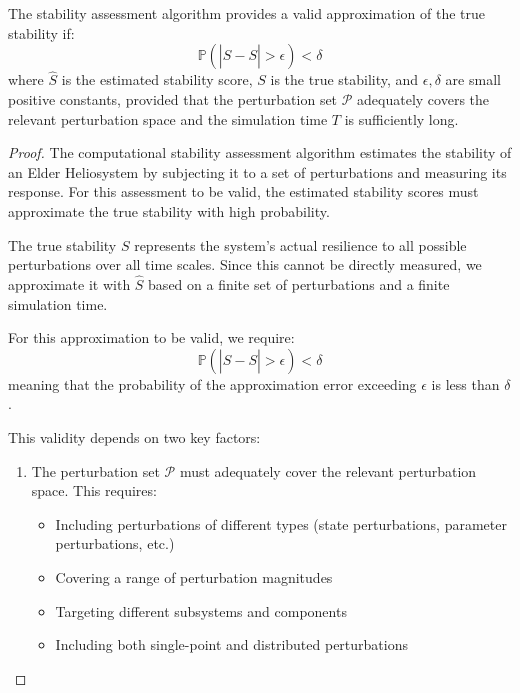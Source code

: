 \begin{theorem}
The stability assessment algorithm provides a valid approximation of the true stability if:
\begin{equation}
\mathbb{P}(|\hat{S} - S| > \epsilon) < \delta
\end{equation}
where $\hat{S}$ is the estimated stability score, $S$ is the true stability, and $\epsilon, \delta$ are small positive constants, provided that the perturbation set $\mathcal{P}$ adequately covers the relevant perturbation space and the simulation time $T$ is sufficiently long.
\end{theorem}

\begin{proof}
The computational stability assessment algorithm estimates the stability of an Elder Heliosystem by subjecting it to a set of perturbations and measuring its response. For this assessment to be valid, the estimated stability scores must approximate the true stability with high probability.

The true stability $S$ represents the system's actual resilience to all possible perturbations over all time scales. Since this cannot be directly measured, we approximate it with $\hat{S}$ based on a finite set of perturbations and a finite simulation time.

For this approximation to be valid, we require:
\begin{equation}
\mathbb{P}(|\hat{S} - S| > \epsilon) < \delta
\end{equation}
meaning that the probability of the approximation error exceeding $\epsilon$ is less than $\delta$.

This validity depends on two key factors:
\begin{enumerate}
    \item The perturbation set $\mathcal{P}$ must adequately cover the relevant perturbation space. This requires:
    \begin{itemize}
        \item Including perturbations of different types (state perturbations, parameter perturbations, etc.)
        \item Covering a range of perturbation magnitudes
        \item Targeting different subsystems and components
        \item Including both single-point and distributed perturbations
    \end{itemize}
    

\end{enumerate}
\end{proof}
